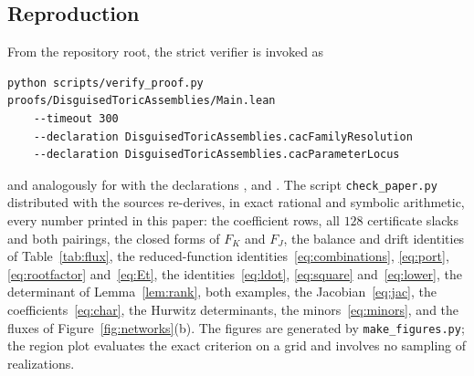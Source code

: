 \documentclass[11pt,a4paper]{article}
\theoremstyle{plain}
\theoremstyle{definition}
\theoremstyle{remark}
\begin{document}
\subsection{Reproduction}

From the repository root, the strict verifier is invoked as
\begin{verbatim}
python scripts/verify_proof.py proofs/DisguisedToricAssemblies/Main.lean
    --timeout 300
    --declaration DisguisedToricAssemblies.cacFamilyResolution
    --declaration DisguisedToricAssemblies.cacParameterLocus
\end{verbatim}
and analogously for  with the declarations ,  and . The script \texttt{check\_paper.py} distributed with the sources re-derives, in exact rational and symbolic arithmetic, every number printed in this paper: the coefficient rows, all $128$ certificate slacks and both pairings, the closed forms of $F_K$ and $F_J$, the balance and drift identities of Table~\ref{tab:flux}, the reduced-function identities~\eqref{eq:combinations}, \eqref{eq:port}, \eqref{eq:rootfactor} and~\eqref{eq:Et}, the identities~\eqref{eq:ldot}, \eqref{eq:square} and~\eqref{eq:lower}, the determinant of Lemma~\ref{lem:rank}, both examples, the Jacobian~\eqref{eq:jac}, the coefficients~\eqref{eq:char}, the Hurwitz determinants, the minors~\eqref{eq:minors}, and the fluxes of Figure~\ref{fig:networks}(b). The figures are generated by \texttt{make\_figures.py}; the region plot evaluates the exact criterion on a grid and involves no sampling of realizations.



\end{document}
